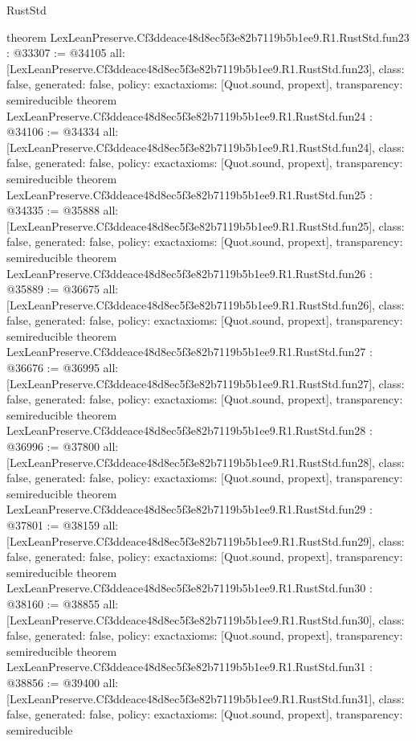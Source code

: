 \begin{lexlean}{RustStd}
\begin{coremodule}
{}
theorem LexLeanPreserve.Cf3ddeace48d8ec5f3e82b7119b5b1ee9.R1.RustStd.fun23 : @33307 := @34105 {
  all: [LexLeanPreserve.Cf3ddeace48d8ec5f3e82b7119b5b1ee9.R1.RustStd.fun23],
  class: false,
  generated: false,
  policy: exact{axioms: [Quot.sound, propext]},
  transparency: semireducible
}
theorem LexLeanPreserve.Cf3ddeace48d8ec5f3e82b7119b5b1ee9.R1.RustStd.fun24 : @34106 := @34334 {
  all: [LexLeanPreserve.Cf3ddeace48d8ec5f3e82b7119b5b1ee9.R1.RustStd.fun24],
  class: false,
  generated: false,
  policy: exact{axioms: [Quot.sound, propext]},
  transparency: semireducible
}
theorem LexLeanPreserve.Cf3ddeace48d8ec5f3e82b7119b5b1ee9.R1.RustStd.fun25 : @34335 := @35888 {
  all: [LexLeanPreserve.Cf3ddeace48d8ec5f3e82b7119b5b1ee9.R1.RustStd.fun25],
  class: false,
  generated: false,
  policy: exact{axioms: [Quot.sound, propext]},
  transparency: semireducible
}
theorem LexLeanPreserve.Cf3ddeace48d8ec5f3e82b7119b5b1ee9.R1.RustStd.fun26 : @35889 := @36675 {
  all: [LexLeanPreserve.Cf3ddeace48d8ec5f3e82b7119b5b1ee9.R1.RustStd.fun26],
  class: false,
  generated: false,
  policy: exact{axioms: [Quot.sound, propext]},
  transparency: semireducible
}
theorem LexLeanPreserve.Cf3ddeace48d8ec5f3e82b7119b5b1ee9.R1.RustStd.fun27 : @36676 := @36995 {
  all: [LexLeanPreserve.Cf3ddeace48d8ec5f3e82b7119b5b1ee9.R1.RustStd.fun27],
  class: false,
  generated: false,
  policy: exact{axioms: [Quot.sound, propext]},
  transparency: semireducible
}
theorem LexLeanPreserve.Cf3ddeace48d8ec5f3e82b7119b5b1ee9.R1.RustStd.fun28 : @36996 := @37800 {
  all: [LexLeanPreserve.Cf3ddeace48d8ec5f3e82b7119b5b1ee9.R1.RustStd.fun28],
  class: false,
  generated: false,
  policy: exact{axioms: [Quot.sound, propext]},
  transparency: semireducible
}
theorem LexLeanPreserve.Cf3ddeace48d8ec5f3e82b7119b5b1ee9.R1.RustStd.fun29 : @37801 := @38159 {
  all: [LexLeanPreserve.Cf3ddeace48d8ec5f3e82b7119b5b1ee9.R1.RustStd.fun29],
  class: false,
  generated: false,
  policy: exact{axioms: [Quot.sound, propext]},
  transparency: semireducible
}
theorem LexLeanPreserve.Cf3ddeace48d8ec5f3e82b7119b5b1ee9.R1.RustStd.fun30 : @38160 := @38855 {
  all: [LexLeanPreserve.Cf3ddeace48d8ec5f3e82b7119b5b1ee9.R1.RustStd.fun30],
  class: false,
  generated: false,
  policy: exact{axioms: [Quot.sound, propext]},
  transparency: semireducible
}
theorem LexLeanPreserve.Cf3ddeace48d8ec5f3e82b7119b5b1ee9.R1.RustStd.fun31 : @38856 := @39400 {
  all: [LexLeanPreserve.Cf3ddeace48d8ec5f3e82b7119b5b1ee9.R1.RustStd.fun31],
  class: false,
  generated: false,
  policy: exact{axioms: [Quot.sound, propext]},
  transparency: semireducible
}
\end{coremodule}
\end{lexlean}
